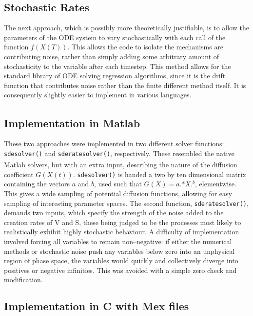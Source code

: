 \documentclass[a4paper, 12pt]{report}
\begin{document}
\subsection{Stochastic Rates}

The next approach, which is possibly more theoretically justifiable, is to allow the parameters of the ODE system to vary stochastically with each call of the function $f(X(T))$. This allows the code to isolate the mechanisms are contributing noise, rather than simply adding some arbitrary amount of stochasticity to the variable after each timestep. This method allows for the standard library of ODE solving regression algorithms, since it is the drift function that contributes noise rather than the finite different method itself. It is consequently slightly easier to implement in various languages.

\subsection{Implementation in Matlab\textsuperscript{\textregistered}}

These two approaches were implemented in two different solver functions: \texttt{sdesolver()} and \texttt{sderatesolver()}, respectively. These resembled the native Matlab\textsuperscript{\textregistered} solvers, but with an extra input, describing the nature of the diffusion coefficient $G(X(t))$. \texttt{sdesolver()} is handed a two by ten dimensional matrix containing the vectors $a$ and $b$, used such that $G(X)=a.$*$X.^b$, elementwise. This gives a wide sampling of potential diffusion functions, allowing for easy sampling of interesting parameter spaces. The second function, \texttt{sderatesolver()}, demands two inputs, which specify the strength of the noise added to the creation rates of V and S, these being judged to be the processes most likely to realistically exhibit highly stochastic behaviour. A difficulty of implementation involved forcing all variables to remain non--negative: if either the numerical methods or stochastic noise push any variables below zero into an unphysical region of phase space, the variables would quickly and collectively diverge into positives or negative infinities. This was avoided with a simple zero check and modification.

\subsection{Implementation in C with Mex files} %
\end{document}
